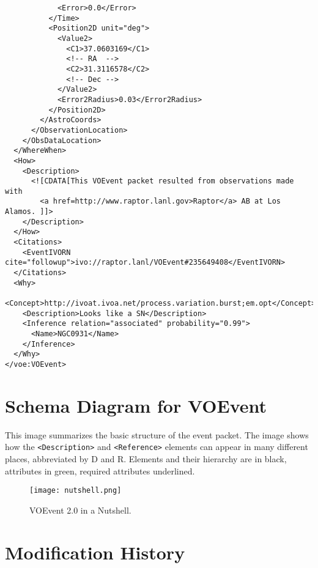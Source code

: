\documentclass[11pt,a4paper]{ivoa}
\begin{document}
\begin{lstlisting}
            <Error>0.0</Error>
          </Time>
          <Position2D unit="deg">
            <Value2>
              <C1>37.0603169</C1>
              <!-- RA  -->
              <C2>31.3116578</C2>
              <!-- Dec -->
            </Value2>
            <Error2Radius>0.03</Error2Radius>
          </Position2D>
        </AstroCoords>
      </ObservationLocation>
    </ObsDataLocation>
  </WhereWhen>
  <How>
    <Description>
      <![CDATA[This VOEvent packet resulted from observations made with
        <a href=http://www.raptor.lanl.gov>Raptor</a> AB at Los Alamos. ]]>
    </Description>
  </How>
  <Citations>
    <EventIVORN cite="followup">ivo://raptor.lanl/VOEvent#235649408</EventIVORN>
  </Citations>
  <Why>
    <Concept>http://ivoat.ivoa.net/process.variation.burst;em.opt</Concept>
    <Description>Looks like a SN</Description>
    <Inference relation="associated" probability="0.99">
      <Name>NGC0931</Name>
    </Inference>
  </Why>
</voe:VOEvent>
\end{lstlisting}

\section{Schema Diagram for VOEvent}
\label{sec:5}
This image summarizes the basic structure of the event packet. The image shows
how the {\tt <Description>} and {\tt <Reference>} elements can appear in many
different places, abbreviated by D and R. Elements and their hierarchy are in
black, attributes in green, required attributes underlined.
\begin{figure}[th]
\begin{center}
\texttt{[image: nutshell.png]} \end{center}
\caption{VOEvent 2.0 in a Nutshell.}
\label{fig:nutshell}
\end{figure}





\appendix

\section{Modification History}
\end{document}

